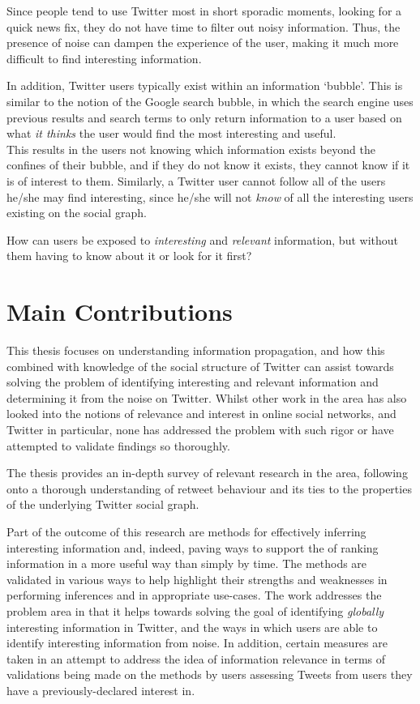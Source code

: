 Since people tend to use Twitter most in short sporadic moments, looking for a quick news fix, they do not have time to filter out noisy information. Thus, the presence of noise can dampen the experience of the user, making it much more difficult to find interesting information.

In addition, Twitter users typically exist within an information `bubble'. This is similar to the notion of the Google search bubble, in which the search engine uses previous results and search terms to only return information to a user based on what \textit{it thinks} the user would find the most interesting and useful.\\
This results in the users not knowing which information exists beyond the confines of their bubble, and if they do not know it exists, they cannot know if it is of interest to them. Similarly, a Twitter user cannot follow all of the users he/she may find interesting, since he/she will not \textit{know} of all the interesting users existing on the social graph.

How can users be exposed to \textit{interesting} and \textit{relevant} information, but without them having to know about it or look for it first?


\section{Main Contributions}
This thesis focuses on understanding information propagation, and how this combined with knowledge of the social structure of Twitter can assist towards solving the problem of identifying interesting and relevant information and determining it from the noise on Twitter. Whilst other work in the area has also looked into the notions of relevance and interest in online social networks, and Twitter in particular, none has addressed the problem with such rigor or have attempted to validate findings so thoroughly.

The thesis provides an in-depth survey of relevant research in the area, following onto a thorough understanding of retweet behaviour and its ties to the properties of the underlying Twitter social graph. 

Part of the outcome of this research are methods for effectively inferring interesting information and, indeed, paving ways to support the of ranking information in a more useful way than simply by time. The methods are validated in various ways to help highlight their strengths and weaknesses in performing inferences and in appropriate use-cases. The work addresses the problem area in that it helps towards solving the goal of identifying \textit{globally} interesting information in Twitter, and the ways in which users are able to identify interesting information from noise. In addition, certain measures are taken in an attempt to address the idea of information relevance in terms of validations being made on the methods by users assessing Tweets from users they have a previously-declared interest in.


